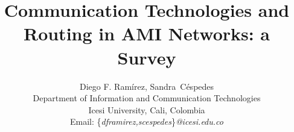 \documentclass[11pt,draftclsnofoot,onecolumn]{IEEEtran}
\begin{document}
%
\title{Communication Technologies and Routing in AMI Networks: a Survey}
%
%
%

\author{Diego F. Ram\'{i}rez, 
			 Sandra~C\'{e}spedes\\%
			 Department of Information and Communication Technologies\\%
			 Icesi University, Cali, Colombia\\%
			 Email: \{\textit{dframirez,scespedes}\}\textit{@icesi.edu.co}}

%
%



%
\end{document}
